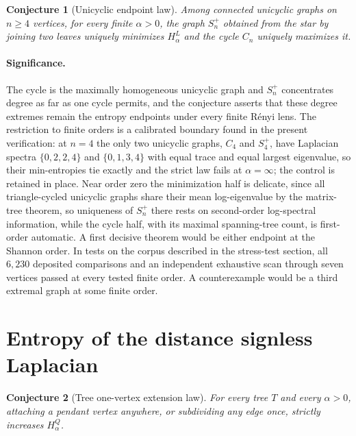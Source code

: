 \documentclass[11pt]{article}
\newtheorem{conjecture}{Conjecture}
\theoremstyle{definition}
\begin{document}
\begin{conjecture}[Unicyclic endpoint law]\label{ab5}
Among connected unicyclic graphs on $n\ge4$ vertices, for every finite $\alpha>0$, the graph $S_n^+$ obtained from the star by joining two leaves uniquely minimizes $H^L_\alpha$ and the cycle $C_n$ uniquely maximizes it.
\end{conjecture}

\paragraph{Significance.}
The cycle is the maximally homogeneous unicyclic graph and $S_n^+$ concentrates degree as far as one cycle permits, and the conjecture asserts that these degree extremes remain the entropy endpoints under every finite R\'enyi lens.  The restriction to finite orders is a calibrated boundary found in the present verification: at $n=4$ the only two unicyclic graphs, $C_4$ and $S_4^+$, have Laplacian spectra $\{0,2,2,4\}$ and $\{0,1,3,4\}$ with equal trace and equal largest eigenvalue, so their min-entropies tie exactly and the strict law fails at $\alpha=\infty$; the control is retained in place.  Near order zero the minimization half is delicate, since all triangle-cycled unicyclic graphs share their mean log-eigenvalue by the matrix-tree theorem, so uniqueness of $S_n^+$ there rests on second-order log-spectral information, while the cycle half, with its maximal spanning-tree count, is first-order automatic.  A first decisive theorem would be either endpoint at the Shannon order.  In tests on the corpus described in the stress-test section, all $6{,}230$ deposited comparisons and an independent exhaustive scan through seven vertices passed at every tested finite order.  A counterexample would be a third extremal graph at some finite order.

\section{Entropy of the distance signless Laplacian}

\begin{conjecture}[Tree one-vertex extension law]\label{ab6}
For every tree $T$ and every $\alpha>0$, attaching a pendant vertex anywhere, or subdividing any edge once, strictly increases $H^Q_\alpha$.
\end{conjecture}
\end{document}
